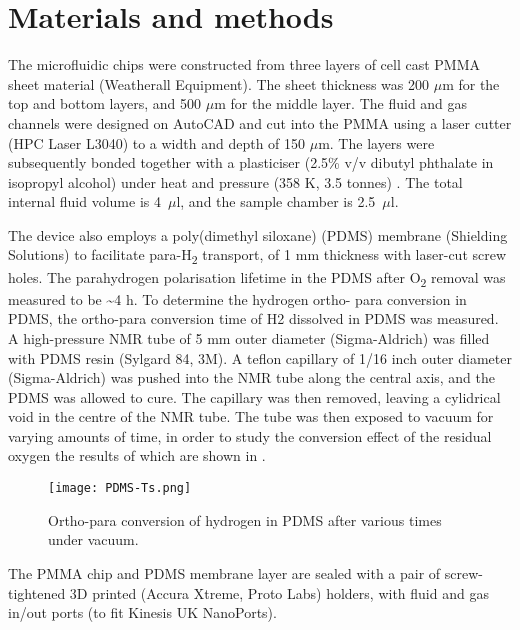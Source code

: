 \section{Materials and methods}\label{pHMaterialandMethods}
The
microfluidic chips were constructed from three layers of cell cast PMMA sheet
material (Weatherall Equipment).  The sheet thickness was 200 $\mu$m for the
top and bottom layers, and 500 $\mu$m for the middle layer. The fluid and gas
channels were designed on AutoCAD and cut into the PMMA using a laser cutter
(HPC Laser L3040) to a width and depth of 150 $\mu$m. The layers were
subsequently bonded together with a plasticiser (2.5\% v/v dibutyl phthalate in
isopropyl alcohol) under heat and pressure (358 K, 3.5
tonnes) \cite{Yilmaz:2016fx}. The total internal fluid volume is 4~$\mu$l, and
the sample chamber is 2.5~$\mu$l.

The device also employs a poly(dimethyl siloxane) (PDMS) membrane
(Shielding Solutions) to facilitate para-H\textsubscript{2} transport,
of 1 mm thickness with laser-cut screw holes. The parahydrogen
polarisation lifetime in the PDMS after O\textsubscript{2} removal was
measured to be \textasciitilde{}4 h. To determine the hydrogen ortho- para
conversion in PDMS, the ortho-para conversion time of H2 dissolved in PDMS
was measured. A high-pressure NMR tube of 5 mm outer diameter
(Sigma-Aldrich) was filled with PDMS resin (Sylgard 84, 3M). A teflon
capillary of 1/16 inch outer diameter (Sigma-Aldrich) was pushed
into the NMR tube along the central axis, and the PDMS was allowed to cure.
The capillary was then removed, leaving a cylidrical void in the centre of
the NMR tube. The tube was then exposed to vacuum for varying amounts of
time, in order to study the conversion effect of the residual oxygen the
results of which are shown in .

\begin{figure}
  \texttt{[image: PDMS-Ts.png]}
  \caption{Ortho-para conversion of hydrogen in PDMS after various times
  under vacuum.}
  \label{fig:ph2conv}
\end{figure}

The PMMA chip and PDMS membrane layer are sealed with a pair of
screw-tightened 3D printed (Accura Xtreme, Proto Labs) holders, with
fluid and gas in/out ports (to fit Kinesis UK NanoPorts).

